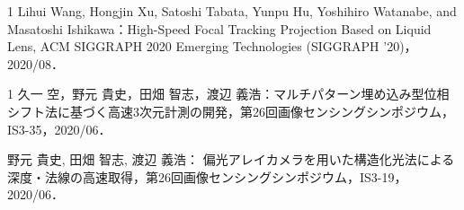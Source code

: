 \begin{査読付}{1}
Lihui Wang, Hongjin Xu, Satoshi Tabata, Yunpu Hu, Yoshihiro Watanabe, and Masatoshi Ishikawa：High-Speed Focal Tracking Projection Based on Liquid Lens, ACM SIGGRAPH 2020 Emerging Technologies (SIGGRAPH '20)，2020/08．

\end{査読付}

\begin{発表}{1}
久一 空，野元 貴史，田畑 智志，渡辺 義浩：マルチパターン埋め込み型位相シフト法に基づく高速3次元計測の開発，第26回画像センシングシンポジウム，IS3-35，2020/06．

野元 貴史, 田畑 智志, 渡辺 義浩： 偏光アレイカメラを用いた構造化光法による深度・法線の高速取得，第26回画像センシングシンポジウム，IS3-19，2020/06．

\end{発表}